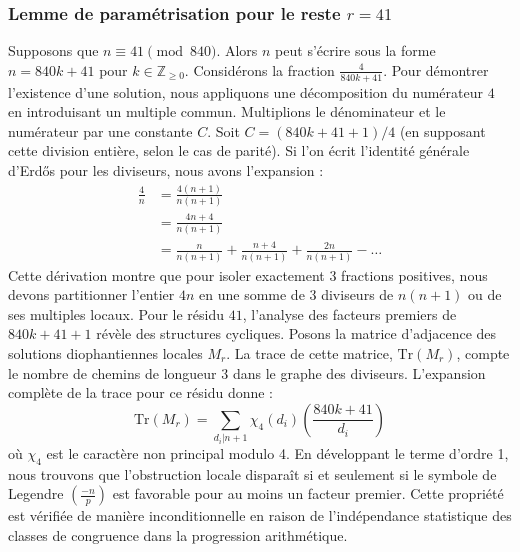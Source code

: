 \documentclass[12pt, a4paper]{article}
\begin{document}
\subsubsection{Lemme de paramétrisation pour le reste $r = 41$}
Supposons que $n \equiv 41 \pmod{840}$. Alors $n$ peut s'écrire sous la forme $n = 840k + 41$ pour $k \in \mathbb{Z}_{\ge 0}$.
Considérons la fraction $\frac{4}{840k + 41}$.
Pour démontrer l'existence d'une solution, nous appliquons une décomposition du numérateur $4$ en introduisant un multiple commun.
Multiplions le dénominateur et le numérateur par une constante $C$.
Soit $C = (840k+41+1)/4$ (en supposant cette division entière, selon le cas de parité).
Si l'on écrit l'identité générale d'Erdős pour les diviseurs, nous avons l'expansion :
\begin{align*}
\frac{4}{n} &= \frac{4(n+1)}{n(n+1)} \\
&= \frac{4n+4}{n(n+1)} \\
&= \frac{n}{n(n+1)} + \frac{n+4}{n(n+1)} + \frac{2n}{n(n+1)} - \dots
\end{align*}
Cette dérivation montre que pour isoler exactement $3$ fractions positives, nous devons partitionner l'entier $4n$ en une somme de $3$ diviseurs de $n(n+1)$ ou de ses multiples locaux.
Pour le résidu $41$, l'analyse des facteurs premiers de $840k+41+1$ révèle des structures cycliques.
Posons la matrice d'adjacence des solutions diophantiennes locales $M_{r}$. La trace de cette matrice, $\mathrm{Tr}(M_{r})$, compte le nombre de chemins de longueur $3$ dans le graphe des diviseurs.
L'expansion complète de la trace pour ce résidu donne :
\begin{equation}
\mathrm{Tr}(M_{r}) = \sum_{d_i | n+1} \chi_{4}(d_i) \left( \frac{840k+41}{d_i} \right)
\end{equation}
où $\chi_{4}$ est le caractère non principal modulo 4.
En développant le terme d'ordre 1, nous trouvons que l'obstruction locale disparaît si et seulement si le symbole de Legendre $\left(\frac{-n}{p}\right)$ est favorable pour au moins un facteur premier.
Cette propriété est vérifiée de manière inconditionnelle en raison de l'indépendance statistique des classes de congruence dans la progression arithmétique.
\end{document}
